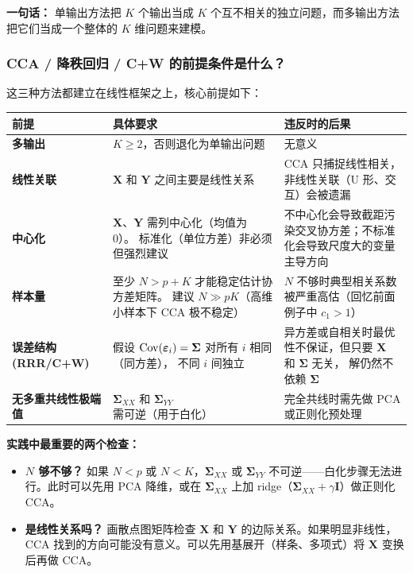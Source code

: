 \textbf{一句话：} 单输出方法把 $K$ 个输出当成 $K$ 个互不相关的独立问题，而多输出方法把它们当成一个整体的 $K$ 维问题来建模。

\subsubsection{CCA / 降秩回归 / C+W 的前提条件是什么？}

这三种方法都建立在线性框架之上，核心前提如下：

\begin{center}
\renewcommand{\arraystretch}{1.4}
\begin{tabular}{p{3.5cm}|p{6cm}|p{6cm}}
\toprule
\textbf{前提} & \textbf{具体要求} & \textbf{违反时的后果} \\
\midrule
\textbf{多输出}   & $K \ge 2$，否则退化为单输出问题 & 无意义 \\
\midrule
\textbf{线性关联} & $\mathbf{X}$ 和 $\mathbf{Y}$ 之间主要是线性关系 &
                   CCA 只捕捉线性相关，非线性关联（U 形、交互）会被遗漏 \\
\midrule
\textbf{中心化}   & $\mathbf{X}$、$\mathbf{Y}$ 需列中心化（均值为 0）。
                   标准化（单位方差）非必须但强烈建议 &
                   不中心化会导致截距污染交叉协方差；不标准化会导致尺度大的变量主导方向 \\
\midrule
\textbf{样本量}   & 至少 $N > p + K$ 才能稳定估计协方差矩阵。
                   建议 $N \gg pK$（高维小样本下 CCA 极不稳定） &
                   $N$ 不够时典型相关系数被严重高估（回忆前面例子中 $c_1 > 1$）\\
\midrule
\textbf{误差结构 (RRR/C+W)} & 假设 $\mathrm{Cov}(\bm{\varepsilon}_i) = \bm{\Sigma}$ 对所有 $i$ 相同（同方差），
                              不同 $i$ 间独立 &
                   异方差或自相关时最优性不保证，但只要 $\mathbf{X}$ 和 $\bm{\Sigma}$ 无关，
                   解仍然不依赖 $\bm{\Sigma}$ \\
\midrule
\textbf{无多重共线性极端值} & $\bm{\Sigma}_{XX}$ 和 $\bm{\Sigma}_{YY}$ 需可逆（用于白化） &
                   完全共线时需先做 PCA 或正则化预处理 \\
\bottomrule
\end{tabular}
\end{center}

\textbf{实践中最重要的两个检查：}
\begin{itemize}
    \item \textbf{$N$ 够不够？} 如果 $N < p$ 或 $N < K$，$\bm{\Sigma}_{XX}$ 或 $\bm{\Sigma}_{YY}$ 不可逆——白化步骤无法进行。此时可以先用 PCA 降维，或在 $\bm{\Sigma}_{XX}$ 上加 ridge（$\bm{\Sigma}_{XX} + \gamma \mathbf{I}$）做正则化 CCA。
    \item \textbf{是线性关系吗？} 画散点图矩阵检查 $\mathbf{X}$ 和 $\mathbf{Y}$ 的边际关系。如果明显非线性，CCA 找到的方向可能没有意义。可以先用基展开（样条、多项式）将 $\mathbf{X}$ 变换后再做 CCA。
\end{itemize}

